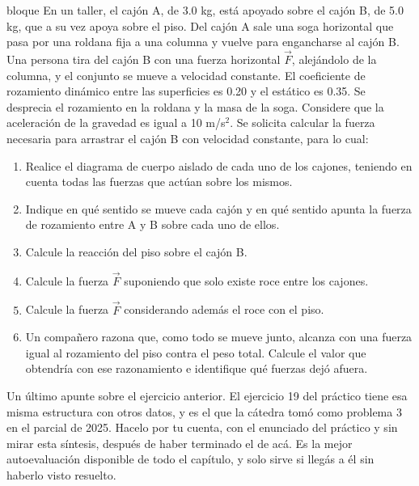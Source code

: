 \documentclass[11pt,openany]{book}
\begin{document}
\begin{ejercicio}{bloque}
En un taller, el cajón A, de 3.0 kg, está apoyado sobre el cajón B, de 5.0 kg, que a su vez apoya sobre el piso. Del cajón A sale una soga horizontal que pasa por una roldana fija a una columna y vuelve para engancharse al cajón B. Una persona tira del cajón B con una fuerza horizontal $\vec F$, alejándolo de la columna, y el conjunto se mueve a velocidad constante. El coeficiente de rozamiento dinámico entre las superficies es 0.20 y el estático es 0.35. Se desprecia el rozamiento en la roldana y la masa de la soga. Considere que la aceleración de la gravedad es igual a 10 m/s$^2$. Se solicita calcular la fuerza necesaria para arrastrar el cajón B con velocidad constante, para lo cual:
\begin{enumerate}[label=(\alph*), leftmargin=1.7em, itemsep=1pt, topsep=3pt]
  \item Realice el diagrama de cuerpo aislado de cada uno de los cajones, teniendo en cuenta todas las fuerzas que actúan sobre los mismos.
  \item Indique en qué sentido se mueve cada cajón y en qué sentido apunta la fuerza de rozamiento entre A y B sobre cada uno de ellos.
  \item Calcule la reacción del piso sobre el cajón B.
  \item Calcule la fuerza $\vec F$ suponiendo que solo existe roce entre los cajones.
  \item Calcule la fuerza $\vec F$ considerando además el roce con el piso.
  \item Un compañero razona que, como todo se mueve junto, alcanza con una fuerza igual al rozamiento del piso contra el peso total. Calcule el valor que obtendría con ese razonamiento e identifique qué fuerzas dejó afuera.
\end{enumerate}
\end{ejercicio}

Un último apunte sobre el ejercicio anterior. El ejercicio 19 del práctico tiene esa misma estructura con otros datos, y es el que la cátedra tomó como problema 3 en el parcial de 2025. Hacelo por tu cuenta, con el enunciado del práctico y sin mirar esta síntesis, después de haber terminado el de acá. Es la mejor autoevaluación disponible de todo el capítulo, y solo sirve si llegás a él sin haberlo visto resuelto.
\end{document}

